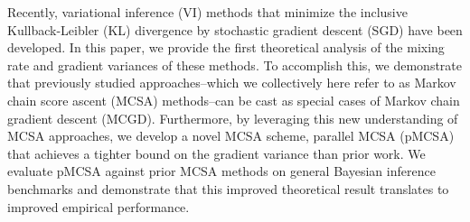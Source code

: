
Recently, variational inference (VI) methods that minimize the inclusive Kullback-Leibler (KL) divergence by stochastic gradient descent (SGD) have been developed.  In this paper, we provide the first theoretical analysis of the mixing rate and gradient variances of these methods. To accomplish this, we demonstrate that previously studied approaches--which we collectively here refer to as Markov chain score ascent (MCSA) methods--can be cast as special cases of Markov chain gradient descent (MCGD). Furthermore, by leveraging this new understanding of MCSA approaches, we develop a novel MCSA scheme, parallel MCSA (pMCSA) that achieves a tighter bound on the gradient variance than prior work. We evaluate pMCSA against prior MCSA methods on general Bayesian inference benchmarks and demonstrate that this improved theoretical result translates to improved empirical performance. 



